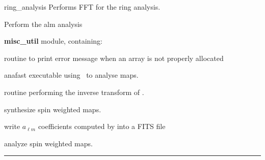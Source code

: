 \begin{modules}
  \begin{sulist}{} %
  \item[ring\_analysis] Performs FFT for the ring analysis.
  \item[\htmlref{map2alm}{sub:map2alm}] Perform the alm analysis
  \item[\textbf{misc\_util}] module, containing:
  \item[\htmlref{assert\_alloc}{sub:assert}] routine to print error message when an array is not
  properly allocated		
  \end{sulist}
\end{modules}

\begin{related}
  \begin{sulist}{} %
  \item[anafast] executable using \thedocid \ to analyse maps.
  \item[\htmlref{alm2map}{sub:alm2map}] routine performing the inverse transform of \thedocid.
  \item[\htmlref{alm2map\_spin}{sub:alm2map_spin}] synthesize spin weighted
maps.
  \item[\htmlref{dump\_alms}{sub:dump_alms}] write $a_{\ell m}$ coefficients
computed by \thedocid into a FITS file
  \item[\htmlref{map2alm\_spin}{sub:map2alm_spin}] analyze spin weighted maps.
  \end{sulist}
\end{related}

\rule{\hsize}{2mm}

\newpage
